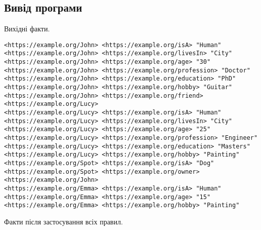 \documentclass[12pt, a4paper]{article}
\begin{document}
\subsection{Вивід програми}

Вихідні факти.

\begin{lstlisting}[breaklines=true]
<https://example.org/John> <https://example.org/isA> "Human"
<https://example.org/John> <https://example.org/livesIn> "City"
<https://example.org/John> <https://example.org/age> "30"
<https://example.org/John> <https://example.org/profession> "Doctor"
<https://example.org/John> <https://example.org/education> "PhD"
<https://example.org/John> <https://example.org/hobby> "Guitar"
<https://example.org/John> <https://example.org/friend> <https://example.org/Lucy>
<https://example.org/Lucy> <https://example.org/isA> "Human"
<https://example.org/Lucy> <https://example.org/livesIn> "City"
<https://example.org/Lucy> <https://example.org/age> "25"
<https://example.org/Lucy> <https://example.org/profession> "Engineer"
<https://example.org/Lucy> <https://example.org/education> "Masters"
<https://example.org/Lucy> <https://example.org/hobby> "Painting"
<https://example.org/Spot> <https://example.org/isA> "Dog"
<https://example.org/Spot> <https://example.org/owner> <https://example.org/John>
<https://example.org/Emma> <https://example.org/isA> "Human"
<https://example.org/Emma> <https://example.org/age> "15"
<https://example.org/Emma> <https://example.org/hobby> "Painting"
\end{lstlisting}

Факти після застосування всіх правил.
\end{document}
